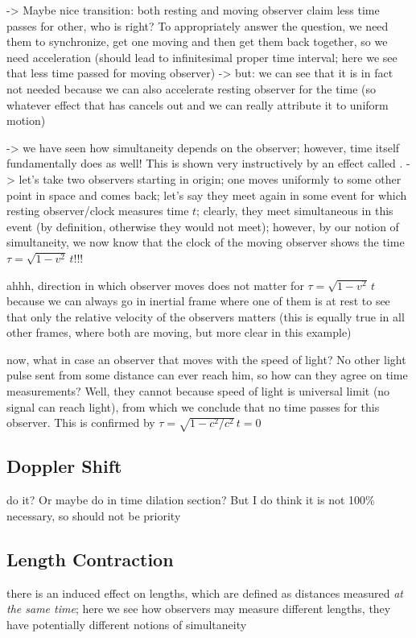 -> Maybe nice transition: both resting and moving observer claim less time passes for other, who is right? To appropriately answer the question, we need them to synchronize, get one moving and then get them back together, so we need acceleration (should lead to infinitesimal proper time interval; here we see that less time passed for moving observer) -> but: we can see that it is in fact not needed because we can also accelerate resting observer for the time (so whatever effect that has cancels out and we can really attribute it to uniform motion)



-> we have seen how simultaneity depends on the observer; however, time itself fundamentally does as well! This is shown very instructively by an effect called . -> let's take two observers starting in origin; one moves uniformly to some other point in space and comes back; let's say they meet again in some event for which resting observer/clock measures time $t$; clearly, they meet simultaneous in this event (by definition, otherwise they would not meet); however, by our notion of simultaneity, we now know that the clock of the moving observer shows the time $\tau = \sqrt{1 - v^2} \, t$!!!


ahhh, direction in which observer moves does not matter for $\tau = \sqrt{1 - v^2} \, t$ because we can always go in inertial frame where one of them is at rest to see that only the relative velocity of the observers matters (this is equally true in all other frames, where both are moving, but more clear in this example)



now, what in case an observer that moves with the speed of light? No other light pulse sent from some distance can ever reach him, so how can they agree on time measurements? Well, they cannot because speed of light is universal limit (no signal can reach light), from which we conclude that no time passes for this observer. This is confirmed by $\tau = \sqrt{1 - c^2 / c^2} \, t = 0$





		\subsection{Doppler Shift}
do it? Or maybe do in time dilation section? But I do think it is not 100\% necessary, so should not be priority



		\subsection{Length Contraction}
there is an induced effect on lengths, which are defined as distances measured \emph{at the same time}; here we see how observers may measure different lengths, they have potentially different notions of simultaneity





